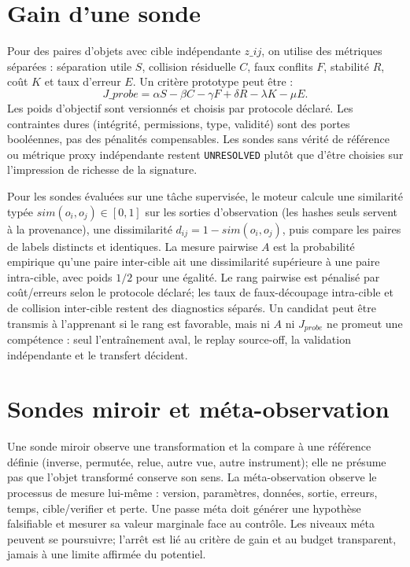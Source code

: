 \documentclass[11pt,a4paper,oneside]{report}
\begin{document}
\section{Gain d'une sonde}
Pour des paires d'objets avec cible indépendante $z\_{ij}$, on utilise des métriques séparées : séparation utile $S$, collision résiduelle $C$, faux conflits $F$, stabilité $R$, coût $K$ et taux d'erreur $E$. Un critère prototype peut être :
\[
 J\_{probe}=\alpha S-\beta C-\gamma F+\delta R-\lambda K-\mu E.
\]
Les poids d'objectif sont versionnés et choisis par protocole déclaré. Les contraintes dures (intégrité, permissions, type, validité) sont des portes booléennes, pas des pénalités compensables. Les sondes sans vérité de référence ou métrique proxy indépendante restent \texttt{UNRESOLVED} plutôt que d'être choisies sur l'impression de richesse de la signature.

Pour les sondes évaluées sur une tâche supervisée, le moteur calcule une similarité typée $sim(o_i,o_j)\in[0,1]$ sur les sorties d'observation (les hashes seuls servent à la provenance), une dissimilarité $d_{ij}=1-sim(o_i,o_j)$, puis compare les paires de labels distincts et identiques. La mesure pairwise $A$ est la probabilité empirique qu'une paire inter-cible ait une dissimilarité supérieure à une paire intra-cible, avec poids $1/2$ pour une égalité. Le rang pairwise est pénalisé par coût/erreurs selon le protocole déclaré; les taux de faux-découpage intra-cible et de collision inter-cible restent des diagnostics séparés. Un candidat peut être transmis à l'apprenant si le rang est favorable, mais ni $A$ ni $J_{probe}$ ne promeut une compétence : seul l'entraînement aval, le replay source-off, la validation indépendante et le transfert décident.

\section{Sondes miroir et méta-observation}
Une sonde miroir observe une transformation et la compare à une référence définie (inverse, permutée, relue, autre vue, autre instrument); elle ne présume pas que l'objet transformé conserve son sens. La méta-observation observe le processus de mesure lui-même : version, paramètres, données, sortie, erreurs, temps, cible/verifier et perte. Une passe méta doit générer une hypothèse falsifiable et mesurer sa valeur marginale face au contrôle. Les niveaux méta peuvent se poursuivre; l'arrêt est lié au critère de gain et au budget transparent, jamais à une limite affirmée du potentiel.
\end{document}

